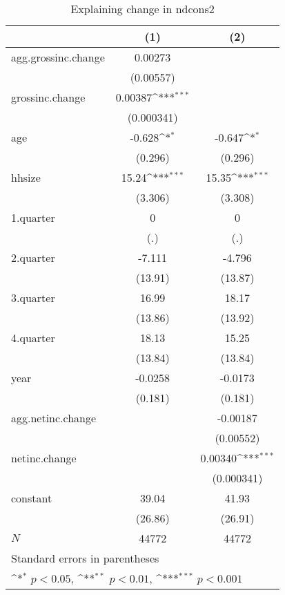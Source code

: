 \begin{table}[htbp]\centering
\def\sym#1{\ifmmode^{#1}\else\(^{#1}\)\fi}
\caption{\label{tab:ndcons2-deltainc} Explaining change in ndcons2}
\begin{tabular}{l*{2}{c}}
\hline\hline
            &\multicolumn{1}{c}{(1)}         &\multicolumn{1}{c}{(2)}         \\
\hline
agg.grossinc.change&     0.00273         &                     \\
            &   (0.00557)         &                     \\
grossinc.change&     0.00387\sym{***}&                     \\
            &  (0.000341)         &                     \\
age         &      -0.628\sym{*}  &      -0.647\sym{*}  \\
            &     (0.296)         &     (0.296)         \\
hhsize      &       15.24\sym{***}&       15.35\sym{***}\\
            &     (3.306)         &     (3.308)         \\
1.quarter   &           0         &           0         \\
            &         (.)         &         (.)         \\
2.quarter   &      -7.111         &      -4.796         \\
            &     (13.91)         &     (13.87)         \\
3.quarter   &       16.99         &       18.17         \\
            &     (13.86)         &     (13.92)         \\
4.quarter   &       18.13         &       15.25         \\
            &     (13.84)         &     (13.84)         \\
year        &     -0.0258         &     -0.0173         \\
            &     (0.181)         &     (0.181)         \\
agg.netinc.change&                     &    -0.00187         \\
            &                     &   (0.00552)         \\
netinc.change&                     &     0.00340\sym{***}\\
            &                     &  (0.000341)         \\
constant    &       39.04         &       41.93         \\
            &     (26.86)         &     (26.91)         \\
\hline
\(N\)       &       44772         &       44772         \\
\hline\hline
\multicolumn{3}{l}{\footnotesize Standard errors in parentheses}\\
\multicolumn{3}{l}{\footnotesize \sym{*} \(p<0.05\), \sym{**} \(p<0.01\), \sym{***} \(p<0.001\)}\\
\end{tabular}
\end{table}
